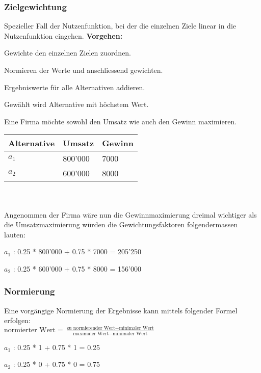 \subsubsection{Zielgewichtung}
Spezieller Fall der Nutzenfunktion, bei der die einzelnen Ziele linear in die Nutzenfunktion eingehen.
\textbf{Vorgehen:} 
\begin{compactenum}
	\item Gewichte den einzelnen Zielen zuordnen.
	\item Normieren der Werte und anschliessend gewichten.
	\item Ergebniswerte für alle Alternativen addieren.
	\item Gewählt wird Alternative mit höchstem Wert.
\end{compactenum}
\begin{example}
	Eine Firma möchte sowohl den Umsatz	wie auch den Gewinn maximieren. \\
	\begin{tabular}{|l|l|l|}
		\hline
		\textbf{Alternative} & \textbf{Umsatz} & \textbf{Gewinn} \\ \hline
		$a_1$ & 800'000 & 7000 \\ \hline
		$a_2$ & 600'000 & 8000 \\ \hline		
	\end{tabular} \\ \ \\
	Angenommen der Firma wäre nun die Gewinnmaximierung dreimal wichtiger als die Umsatzmaximierung würden die Gewichtungsfaktoren folgendermassen lauten: 
	\begin{compactitem}
		\item $a_1$ : 0.25 * 800'000 + 0.75 * 7000 = 205'250
		\item $a_2$ : 0.25 * 600'000 + 0.75 * 8000 = 156'000
	\end{compactitem}
\end{example}

\subsubsection{Normierung}
Eine vorgängige Normierung der Ergebnisse kann mittels folgender Formel erfolgen: \\
$\text{normierter Wert} = \frac{\text{zu normierender Wert} - \text{minimaler Wert}}{\text{maximaler Wert} - \text{minimaler Wert}}$
\begin{example}
	\begin{compactitem}
		\item $a_1$ : 0.25 * 1 + 0.75 * 1 = 0.25
		\item $a_2$ : 0.25 * 0 + 0.75 * 0 = 0.75
	\end{compactitem}
\end{example}